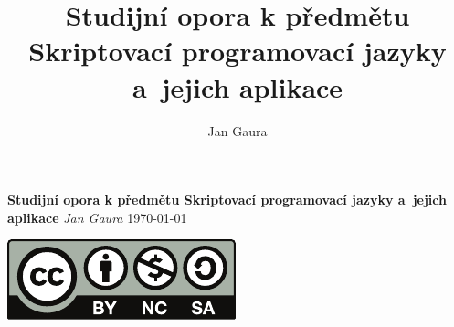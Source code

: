 \documentclass[10pt,oneside]{book}
\title{Studijní opora k předmětu Skriptovací programovací jazyky a~jejich aplikace}
\author{Jan Gaura}
\def\mtitle{Studijní opora k předmětu Skriptovací programovací jazyky a~jejich aplikace}
\def\mauthor{Jan Gaura}
\begin{document}
\newcommand{\rdk}[1]{\texttt{#1}}
\newcommand{\kod}[1]{\textbf{\texttt{#1}}}


\begin{titlepage}
   \begin{center}
      \huge\textbf{\mtitle}
      \vskip0.8cm
      \Large\textit{\mauthor}
      \normalsize{\today}
   \end{center}

   \begin{center}
        \includegraphics{img/by-nc-sa}
    \end{center}

\end{titlepage}

\newpage


\tableofcontents

\newpage















%

%



\printindex       %
\printindex[cmnd] %
\end{document}
